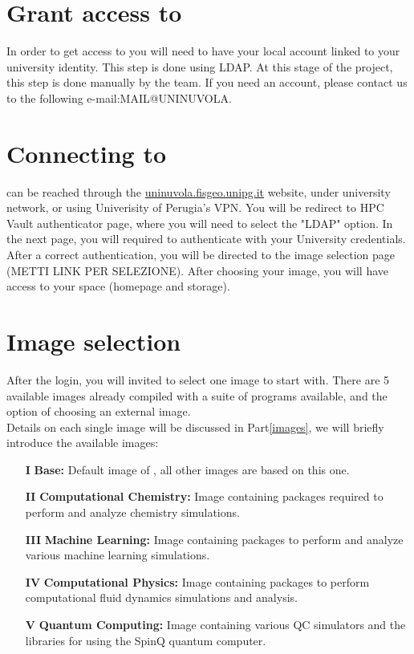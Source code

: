 \section{Grant access to \uninuvola}
In order to get access to \uninuvola you will need to have your local account linked to your university identity. This step is done using LDAP. At this stage of the project, this step is done manually by the \uninuvola team. If you need an account, please contact us to the following e-mail:MAIL@UNINUVOLA.\\ 

\section{Connecting to \uninuvola}
\uninuvola can be reached through the \href{uninuvola.fisgeo.unipg.it/}{uninuvola.fisgeo.unipg.it} website, under university network, or using Univerisity of Perugia's VPN. You will be redirect to HPC Vault authenticator page, where you will need to select the "LDAP" option. In the next page, you will required to authenticate with your University credentials. After a correct authentication, you will be directed to the \jupyterhub image selection page (METTI LINK PER SELEZIONE). After choosing your image, you will have access to your space (homepage and storage). \\

\section{Image selection}
After the login, you will invited to select one image to start with. There are 5 available images already compiled with a suite of programs available, and the option of  choosing an external image.  \\

Details on each single image will be discussed in Part\ref{images}, we will briefly introduce the available images:
\begin{itemize}
    \item[\textbf{I}] \textbf{\uninuvola}  \textbf{Base:} Default image of \uninuvola, all other images are based on this one. 
    \item[\textbf{II}] \textbf{Computational Chemistry:} Image containing packages required to perform and analyze chemistry simulations.     
    \item[\textbf{III}] \textbf{Machine Learning:} Image containing packages to perform and analyze various machine learning simulations. 
    \item[\textbf{IV}] \textbf{Computational Physics:} Image containing packages to perform computational fluid dynamics simulations and analysis.
    \item[\textbf{V}] \textbf{Quantum Computing:} Image containing various QC simulators and the libraries for using the SpinQ quantum computer.
\end{itemize}


